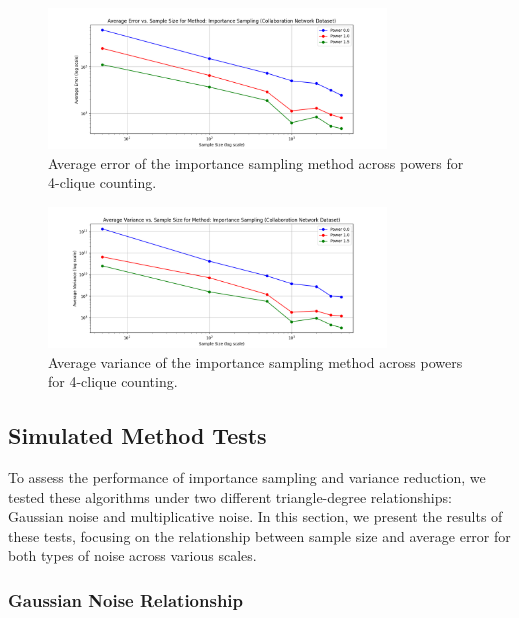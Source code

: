 \documentclass[11pt]{article}
\begin{document}
\begin{figure}[H]
    \centering
    \includegraphics[width=0.8\textwidth]{plots/4-clique/importance-sampling/avg_error_Importance Sampling.png}
    \caption{Average error of the importance sampling method across powers for 4-clique counting.}
    \label{fig:4_clique_avg_error_importance_sampling}
\end{figure}

\begin{figure}[H]
    \centering
    \includegraphics[width=0.8\textwidth]{plots/4-clique/importance-sampling/avg_variance_Importance Sampling.png}
    \caption{Average variance of the importance sampling method across powers for 4-clique counting.}
    \label{fig:4_clique_avg_variance_importance_sampling}
\end{figure}

\subsection{Simulated Method Tests}

To assess the performance of importance sampling and variance reduction, we tested these algorithms under two different triangle-degree relationships: Gaussian noise and multiplicative noise. In this section, we present the results of these tests, focusing on the relationship between sample size and average error for both types of noise across various scales.

\subsubsection{Gaussian Noise Relationship}
\end{document}
